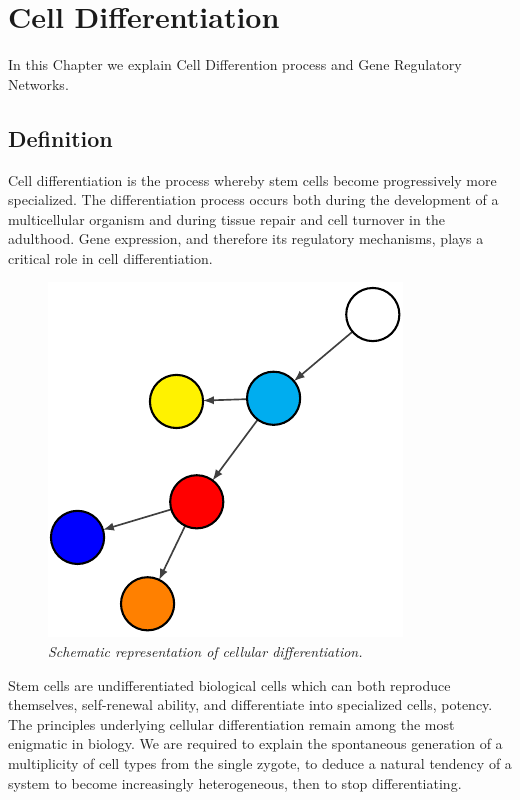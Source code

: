 \chapter{Cell Differentiation }\label{celldiff}
\lhead[\fancyplain{}{\bfseries\thepage}]{\fancyplain{}{\bfseries\rightmark}}

In this Chapter we explain Cell Differention process and Gene Regulatory Networks.

\section{Definition}
Cell differentiation is the process whereby stem cells become progressively
more specialized. The differentiation process occurs both during the development of a multicellular organism and during tissue repair and cell turnover
in the adulthood. Gene expression, and therefore its regulatory mechanisms,
plays a critical role in cell differentiation.
\begin{figure}
\centering
\includegraphics[angle=45]{images/cells.pdf}
\caption{\emph{Schematic representation of cellular differentiation.}}
\end{figure}
Stem cells are undifferentiated biological cells which can both reproduce
themselves, self-renewal ability, and differentiate into specialized cells, potency.
The principles underlying cellular differentiation remain among the most
enigmatic in biology. We are required to explain the spontaneous generation of a multiplicity of cell types from the single zygote, to deduce a natural
tendency of a system to become increasingly heterogeneous, then to stop
differentiating.

